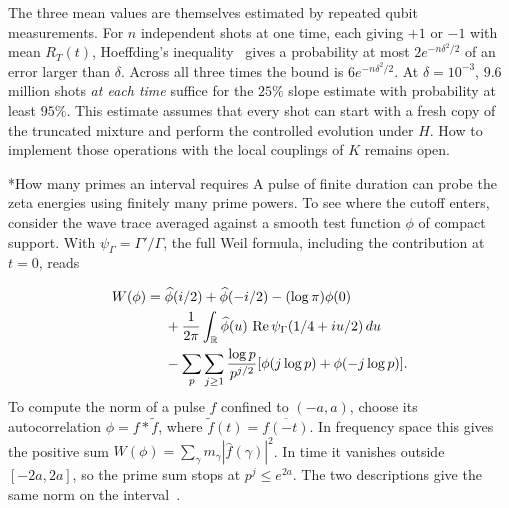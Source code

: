 \documentclass[11pt,letterpaper]{article}
\makeatletter
\renewcommand\subsection{\@startsection{subsection}{2}{\z@}{-2.0ex plus -.3ex}{.75ex}{\normalfont\normalsize\itshape}}
\numberwithin{equation}{section}
\makeatother
\begin{document}
The three mean values are themselves estimated by repeated qubit measurements. For $n$ independent shots at one time, each giving $+1$ or $-1$ with mean $R_T(t)$, Hoeffding's inequality~\cite{hoeffding} gives a probability at most $2e^{-n\delta^2/2}$ of an error larger than $\delta$. Across all three times the bound is $6e^{-n\delta^2/2}$. At $\delta=10^{-3}$, $9.6$ million shots \emph{at each time} suffice for the $25\%$ slope estimate with probability at least $95\%$. This estimate assumes that every shot can start with a fresh copy of the truncated mixture and perform the controlled evolution under $H$. How to implement those operations with the local couplings of $K$ remains open.

\subsection*{How many primes an interval requires}
A pulse of finite duration can probe the zeta energies using finitely many prime powers. To see where the cutoff enters, consider the wave trace averaged against a smooth test function $\phi$ of compact support. With $\psi_\Gamma=\Gamma'/\Gamma$, the full Weil formula, including the contribution at $t=0$, reads

\begin{align}
 W(\phi)={}&\widehat\phi(i/2)+\widehat\phi(-i/2)-(\log\pi)\phi(0)\notag\\
 &+\frac1{2\pi}\int_{\mathbb R}\widehat\phi(u)\,
             \operatorname{Re}\psi_\Gamma(1/4+iu/2)\,du\notag\\
 &-\sum_p\sum_{j\ge1}\frac{\log p}{p^{j/2}}
             [\phi(j\log p)+\phi(-j\log p)] .
 \label{eq:weil}
\end{align}
To compute the norm of a pulse $f$ confined to $(-a,a)$, choose its autocorrelation $\phi=f*\widetilde f$, where $\widetilde f(t)=\overline{f(-t)}$. In frequency space this gives the positive sum $W(\phi)=\sum_\gamma m_\gamma|\widehat f(\gamma)|^2$. In time it vanishes outside $[-2a,2a]$, so the prime sum stops at $p^j\le e^{2a}$. The two descriptions give the same norm on the interval~\cite{connesmarcolli}.
\end{document}
